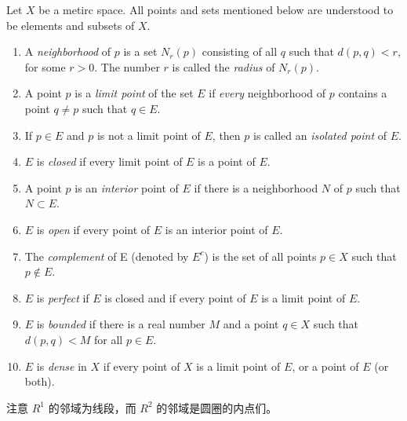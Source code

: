\documentclass[../poma-notes.tex]{subfiles}
\begin{document}
\begin{definition}
  Let $X$ be a metirc space. All points and sets mentioned below are understood to be elements and subsets of $X$.
  \begin{enumerate}[label=(\alph*)]
    \item A \textit{neighborhood} of $p$ is a set $N_r(p)$ consisting of all $q$ such that $d(p,q)<r$, for some $r>0$.
          The number $r$ is called the \textit{radius} of $N_r(p)$.
    \item A point $p$ is a \textit{limit point} of the set $E$ if \textit{every} neighborhood of $p$ contains a point
          $q \ne p$ such that $q \in E$.
    \item If $p \in E$ and $p$ is not a limit point of $E$, then $p$ is called an \textit{isolated point} of $E$.
    \item $E$ is \textit{closed} if every limit point of $E$ is a point of $E$.
    \item A point $p$ is an \textit{interior} point of $E$ if there is a neighborhood $N$ of $p$ such that $N \subset E$.
    \item $E$ is \textit{open} if every point of $E$ is an interior point of $E$.
    \item The \textit{complement} of E (denoted by $E^c$) is the set of all points $p \in X$ such that $p \notin E$.
    \item $E$ is \textit{perfect} if $E$ is closed and if every point of $E$ is a limit point of $E$.
    \item $E$ is \textit{bounded} if there is a real number $M$ and a point $q \in X$ such that $d(p,q)<M$ for all
          $p \in E$.
    \item $E$ is \textit{dense} in $X$ if every point of $X$ is a limit point of $E$, or a point of $E$ (or both).
  \end{enumerate}
\end{definition}

注意 $R^1$ 的邻域为线段，而 $R^2$ 的邻域是圆圈的内点们。
\end{document}

